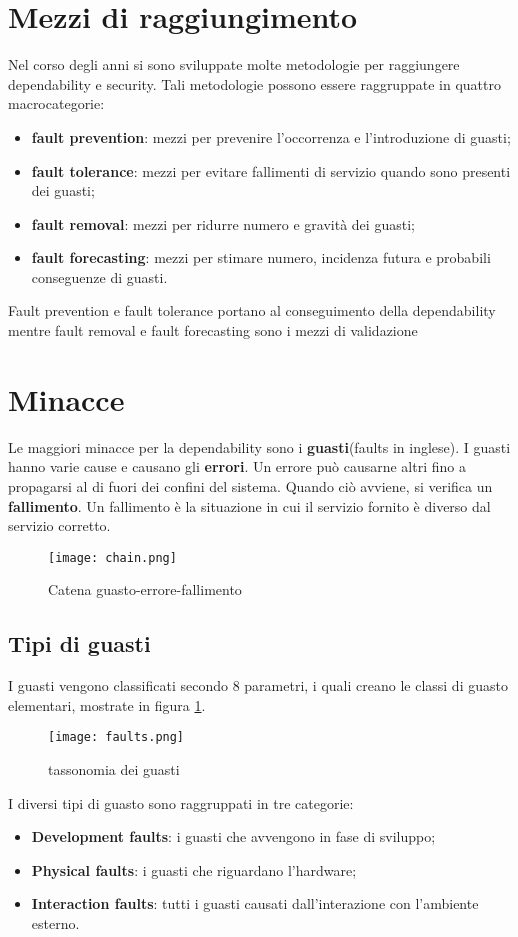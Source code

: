 \section{Mezzi di raggiungimento}
Nel corso degli anni si sono sviluppate molte metodologie per raggiungere dependability e security. Tali metodologie possono essere raggruppate in quattro macrocategorie:
\begin{itemize}
    \item \textbf{fault prevention}: mezzi per prevenire l'occorrenza e l'introduzione di guasti;
    \item \textbf{fault tolerance}: mezzi per evitare fallimenti di servizio quando sono presenti dei guasti;
    \item \textbf{fault removal}: mezzi per ridurre numero e gravità dei guasti;
    \item \textbf{fault forecasting}: mezzi per stimare numero, incidenza futura e probabili conseguenze di guasti.
\end{itemize}
Fault prevention e fault tolerance portano al conseguimento della dependability mentre fault removal e fault forecasting sono i mezzi di validazione
\section{Minacce}
Le maggiori minacce per la dependability sono i \textbf{guasti}(faults in inglese). I guasti hanno varie cause e causano gli \textbf{errori}. Un errore può causarne altri fino a propagarsi
al di fuori dei confini del sistema. Quando ciò avviene, si verifica un \textbf{fallimento}. Un fallimento è la situazione in cui il servizio fornito
è diverso dal servizio corretto.
\begin{figure}[h]
    \texttt{[image: chain.png]}
    \caption{Catena guasto-errore-fallimento}
\end{figure}
\subsection{Tipi di guasti}
I guasti vengono classificati secondo 8 parametri, i quali creano le classi di guasto elementari, mostrate in figura \ref{fig:tax}.
\begin{figure}[h]
    \texttt{[image: faults.png]}
    \caption{tassonomia dei guasti\cite{tax}}
    \label{fig:tax}
\end{figure}
 I diversi tipi di guasto sono raggruppati in tre categorie:
 \begin{itemize}
     \item \textbf{Development faults}: i guasti che avvengono in fase di sviluppo;
     \item \textbf{Physical faults}: i guasti che riguardano l'hardware;
     \item \textbf{Interaction faults}: tutti i guasti causati dall'interazione con l'ambiente esterno.
 \end{itemize}
 \newpage
